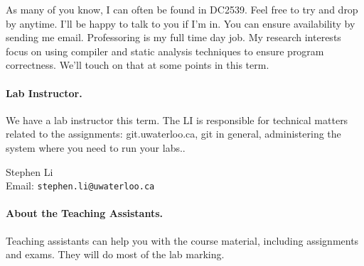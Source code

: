 \documentclass[letterpaper,10pt]{article}
\begin{document}
As many of you know, I can often be found in DC2539. Feel free to try and drop by anytime. I'll be happy to talk to you if I'm in. You can ensure availability by sending me email. Professoring is my full time day job. My research interests focus on using compiler and static analysis techniques to ensure program correctness. We'll touch on that at some points in this term.

\paragraph{Lab Instructor.}
We have a lab instructor this term. The LI is responsible for technical matters related to the assignments: git.uwaterloo.ca, git in general, administering the system where you need to run your labs..

\noindent
\hspace*{2em} \begin{minipage}{.4\textwidth}
Stephen Li\\
Email: {\tt stephen.li@uwaterloo.ca}
\end{minipage}

\newpage
\paragraph{About the Teaching Assistants.}

Teaching assistants can help you with the course material, including assignments and exams. They will do most of the lab marking.


 \\
\end{document}
